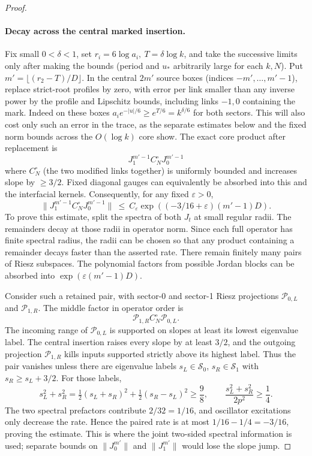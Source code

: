 \begin{proof}
\paragraph{Decay across the central marked insertion.}
Fix small \(0<\delta<1\), set \(r_i=6\log a_i,\ T=\delta\log k\), and take the successive limits only after making the bounds (period and \(u_*\) arbitrarily large for each \(k,N\)). Put \(m'=\lfloor(r_2-T)/D\rfloor\). In the central \(2m'\) source boxes (indices \(-m',\ldots,m'-1\)), replace strict-root profiles by zero, with error per link smaller than any inverse power by the profile and Lipschitz bounds, including links \(-1,0\) containing the mark. Indeed on these boxes
\(a_i e^{-|u|/6}\ge e^{T/6}=k^{\delta/6}\) for both sectors.
This will also cost only such an error in the trace, as the separate estimates below and the fixed norm bounds across the \(O(\log k)\) core show. The exact core product after replacement is
\[
             J_1^{m'-1} C_N^\circ J_0^{m'-1}
\]
where \(C_N^\circ\) (the two modified links together) is uniformly bounded and increases slope by \(\ge3/2\). Fixed diagonal gauges can equivalently be absorbed into this and the interfacial kernels. Consequently, for any fixed \(\varepsilon>0\),
\[
        \|J_1^{m'-1} C_N^\circ J_0^{m'-1}\|
        \ \le\ C_\varepsilon\exp((-3/16+\varepsilon)(m'-1)D).
\]
To prove this estimate, split the spectra of both \(J_t\) at small regular
radii.  The remainders decay at those radii in operator norm.  Since each
full operator has finite spectral radius, the radii can be chosen so that
any product containing a remainder decays faster than the asserted rate.
There remain finitely many pairs of Riesz subspaces.  The polynomial
factors from possible Jordan blocks can be absorbed into
\(\exp(\varepsilon(m'-1)D)\).

Consider such a retained pair, with sector-0 and sector-1 Riesz
projections \(\mathcal P_{0,L}\) and \(\mathcal P_{1,R}\).
The middle factor in operator order is
\[
             \mathcal P_{1,R}C_N^\circ\mathcal P_{0,L}.
\]
The incoming range of \(\mathcal P_{0,L}\) is supported on slopes at
least its lowest eigenvalue label. The central insertion raises every
slope by at least \(3/2\), and the outgoing projection
\(\mathcal P_{1,R}\) kills inputs supported strictly above its highest
label. Thus the pair vanishes unless there are eigenvalue labels
\(s_L\in\mathcal S_0\), \(s_R\in\mathcal S_1\) with
\(s_R\ge s_L+3/2\).  For those labels,
\[
 s_L^2+s_R^2
   =\tfrac12(s_L+s_R)^2+\tfrac12(s_R-s_L)^2
   \ge\frac98,
 \qquad \frac{s_L^2+s_R^2}{2p^2}\ge\frac14.
\]
The two spectral prefactors contribute \(2/32=1/16\), and oscillator
excitations only decrease the rate.  Hence the paired rate is at most
\(1/16-1/4=-3/16\), proving the estimate.  This is where the joint
two-sided spectral information is used; separate bounds on
\(\|J_0^{m'}\|\) and \(\|J_1^{m'}\|\) would lose the slope jump.


\end{proof}
